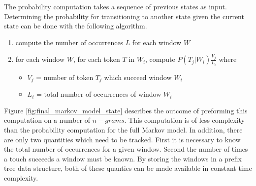 The probability computation takes a sequence of 
previous states as input.
Determining the probability for transitioning to
another state given the current state can be done
with the following algorithm.
%
\begin{enumerate}
\item compute the number of occurrences $L$ for each window $W$
\item for each window $W$, for each token $T$ in $W_i$, compute $P(T_j|W_i)\frac{V_j}{L_i}$ where
  \begin{itemize} 
  \item $V_j$ = number of token $T_j$ which succeed window $W_i$
  \item $L_i$ = total number of occurrences of window $W_i$
  \end{itemize}
\end{enumerate}
%
Figure \ref{fig:final_markov_model_state} 
describes the outcome of 
preforming this computation on a number
of $n-grams$.
%
This computation is of less complexity than 
the probability computation for the full Markov model.
In addition,
there are only two quantities which need to be tracked.
First it is necessary to know the total number of occurrences
for a given window.
Second the number of times a touch succeeds a window must be known. 
%
By storing the windows in a prefix tree data structure,
both of these quanties can be made available in
constant time complexity.



